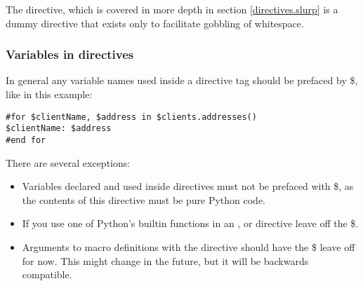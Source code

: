 The  directive, which is covered in more depth in section
\ref{directives.slurp} is a dummy directive that exists only to facilitate
gobbling of whitespace.

\subsubsection{Variables in directives}
\label{TDL.directives.variables}

In general any variable names used inside a directive tag should be prefaced by
\$, like in this example:

\begin{verbatim}
#for $clientName, $address in $clients.addresses()
$clientName: $address
#end for
\end{verbatim}

There are several exceptions: 

\begin{itemize}
\item Variables declared and used inside  directives must not be
     prefaced with \$, as the contents of this directive must be pure Python
     code.

\item If you use one of Python's builtin functions in an ,
      or  directive leave off the \$.

\item Arguments to macro definitions with the  directive should
     have the \$ leave off for now.  This might change in the future, but it
     will be backwards compatible.

\end{itemize}

